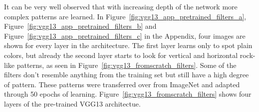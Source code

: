 \begin{figure}[!h]
\label{fig:vgg13_pretrained_filters}
\end{figure}

\newpage

It can be very well observed that with increasing depth of the network more complex patterns are learned. In Figure~\ref{fig:vgg13_app_pretrained_filters_a}, Figure~\ref{fig:vgg13_app_pretrained_filters_b} and Figure~\ref{fig:vgg13_app_pretrained_filters_c} in the Appendix, four images are shown for every layer in the architecture. The first layer learns only to spot plain colors, but already the second layer starts to look for vertical and horizontal rock-like patterns, as seen in Figure~\ref{fig:vgg13_fromscratch_filters}. Some of the filters don't resemble anything from the training set but still have a high degree of pattern. These patterns were transferred over from ImageNet and adapted through 50 epochs of learning. Figure~\ref{fig:vgg13_fromscratch_filters} shows four layers of the pre-trained VGG13 architectue. \\


